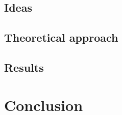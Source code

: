 \documentclass[14pt,a4paper]{article}
\theoremstyle{definition}
\numberwithin{equation}{subsection}
\begin{document}
\subsection{Ideas}
\subsection{Theoretical approach}
\subsection{Results}

\newpage

\section{Conclusion}



\newpage

 \nocite{*} 



\end{document}
